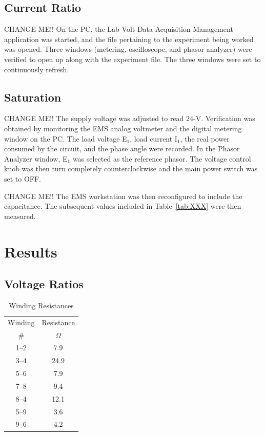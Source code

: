 \documentclass{article}
\begin{document}
\subsection{Current Ratio}
\label{part2}
CHANGE ME!! On the PC, the Lab-Volt Data Acquisition Management application was
started, and the file pertaining to the experiment being worked was opened.
Three windows (metering, oscilloscope, and phasor analyzer) were verified to
open up along with the experiment file. The three windows were set to
continuously refresh.

\subsection{Saturation}
\label{part3}
CHANGE ME!! The supply voltage was adjusted to read 24-V. Verification was
obtained by monitoring the EMS analog voltmeter and the digital metering window
on the {PC}.  The load voltage E$_1$, load current I$_1$, the real power
consumed by the circuit, and the phase angle were recorded. In the Phasor
Analyzer window, E$_1$ was selected as the reference phasor. The voltage
control knob was then turn completely counterclockwise and the main power
switch was set to OFF.

CHANGE ME!! The EMS workstation was then reconfigured to include the
capacitance.  The subsequent values included in Table~\ref{tab:XXX} were then
measured.

\section{Results}
\subsection{Voltage Ratios}
\begin{table}[H]
  \centering
  \begin{tabular}{cc}
    \hline
    Winding & Resistance \\
    \# & $\Omega$ \\
    \hline
    1--2 &  7.9 \\
    3--4 & 24.9 \\
    5--6 &  7.9 \\
    7--8 &  9.4 \\
    8--4 & 12.1 \\
    5--9 &  3.6 \\
    9--6 &  4.2 \\
  \end{tabular}
  \caption{Winding Resistances}
  \label{tab:wind_res}
\end{table}
\end{document}
